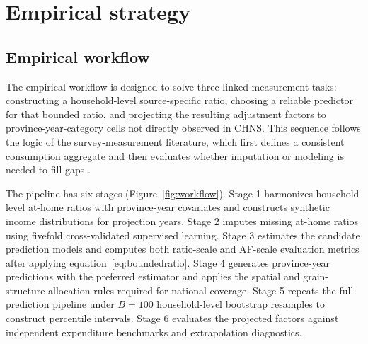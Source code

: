 \documentclass[preprint,12pt,authoryear]{elsarticle}
\begin{document}
\section{Empirical strategy}
\label{sec:methods}

\subsection{Empirical workflow}

The empirical workflow is designed to solve three linked measurement tasks: constructing a household-level source-specific ratio, choosing a reliable predictor for that bounded ratio, and projecting the resulting adjustment factors to province-year-category cells not directly observed in CHNS. This sequence follows the logic of the survey-measurement literature, which first defines a consistent consumption aggregate and then evaluates whether imputation or modeling is needed to fill gaps \citep{DeatonZaidi2002, SmithDupriezTroubat2014, Zezza2017}.

The pipeline has six stages (Figure~\ref{fig:workflow}). Stage 1 harmonizes household-level at-home ratios with province-year covariates and constructs synthetic income distributions for projection years. Stage 2 imputes missing at-home ratios using fivefold cross-validated supervised learning. Stage 3 estimates the candidate prediction models and computes both ratio-scale and AF-scale evaluation metrics after applying equation~\eqref{eq:boundedratio}. Stage 4 generates province-year predictions with the preferred estimator and applies the spatial and grain-structure allocation rules required for national coverage. Stage 5 repeats the full prediction pipeline under $B=100$ household-level bootstrap resamples to construct percentile intervals. Stage 6 evaluates the projected factors against independent expenditure benchmarks and extrapolation diagnostics.
\end{document}
